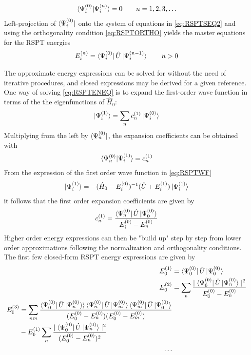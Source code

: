 \begin{equation}
\bra{\smash{\Psi_i^{(0)}}}\ket{\smash{\Psi_i^{(n)}}} = 0 \qquad n = 1,2,3,\ldots
\label{eq:RSPTORTHO}
\end{equation}
\noindent Left-projection of $\bra{\smash{\Psi_i^{(0)}}}$ onto the system of equations in \ref{eq:RSPTSEQ2} and using the orthogonality condition \ref{eq:RSPTORTHO} yields the master equations for the RSPT energies
\begin{equation}
E_i^{(n)} = \bra{\smash{\Psi_i^{(0)}}} \hat{U} \ket{\smash{\Psi_i^{(n-1)}}} \qquad n > 0
\label{eq:RSPTENEQ}
\end{equation}

\noindent The approximate energy expressions can be solved for without the need of iterative procedures, and closed expressions may be derived for a given reference. One way of solving \ref{eq:RSPTENEQ} is to expand the first-order wave function in terms of the the eigenfunctions of $\hat{H}_0$:
\begin{equation}
\ket{\smash{\Psi_i^{(1)}}} = \sum_n c^{(1)}_n \ket{\smash{\Psi_i^{(0)}}}
\end{equation}
\noindent Multiplying from the left by $\bra{\smash{\Psi_n^{(0)}}}$, the expansion coefficients can be obtained with
\begin{equation}
\bra{\smash{\Psi_n^{(0)}}}\ket{\smash{\Psi_i^{(1)}}} = c_n^{(1)}
\end{equation}
From the expression of the first order wave function in \ref{eq:RSPTWF}
\begin{equation}
\ket{\smash{\Psi_i^{(1)}}} = - (\hat{H}_0 - E_i^{(0)})^{-1} (\hat{U} + E_i^{(1)}) \ket{\smash{\Psi_i^{(1)}}} 
\end{equation}
\noindent it follows that the first order expansion coefficients are given by
\begin{equation}
c_n^{(1)} = \frac{\bra{\smash{\Psi_n^{(0)}}} \hat{U} \ket{\smash{\Psi_0^{(0)}}}}{E_i^{(0)} - E_n^{(0)}} 
\end{equation}
\noindent Higher order energy expressions can then be "build up" step by step from lower order approximations following the normalization and orthogonality conditions. The first few closed-form RSPT energy expressions are given by
\begin{align}
E_0^{(1)} &= \bra{\smash{\Psi_0^{(0)}}} \hat{U} \ket{\smash{\Psi_0^{(0)}}} \\
E_0^{(2)} &= \sum_n \frac{
	\mid\bra{\smash{\Psi_0^{(0)}}} \hat{U}\ket{\smash{\Psi_n^{(0)}}} \mid^2
}{
	E_0^{(0)} - E_n^{(0)}
} \\
\begin{split}
E_0^{(3)} &= \sum_{nm} \frac{
	\bra{\smash{\Psi_0^{(0)}}}\hat{U}\ket{\smash{\Psi_n^{(0)})}}
	\bra{\smash{\Psi_n^{(0)}}}\hat{U}\ket{\smash{\Psi_m^{(0)}}}
	\bra{\smash{\Psi_m^{(0)}}}\hat{U}\ket{\smash{\Psi_0^{(0)}}}
}{
	(E_0^{(0)} - E_n^{(0)})(E_0^{(0)} - E_m^{(0)})
} \\
&- E_0^{(1)} \sum_n \frac{
	\mid\bra{\smash{\Psi_0^{(0)}}} \hat{U}\ket{\smash{\Psi_n^{(0)}}} \mid^2
}{
	(E_0^{(0)} - E_n^{(0)})^2
} 
\end{split} \\ \nonumber
\ldots
\end{align}

